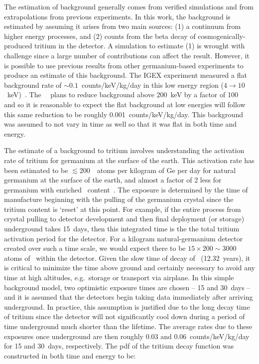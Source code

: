 The estimation of background generally comes from verified simulations and from extrapolations from previous experiments.  In this work, the background is estimated by assuming it arises from two main sources: (1) a continuum from higher energy processes, and (2) counts from the beta decay of cosmogenically-produced tritium in the detector.  A simulation to estimate (1) is wrought with challenge since a large number of contributions can affect the result.  However, it is possible to use previous results from other germanium-based experiments to produce an estimate of this background.  The IGEX experiment measured a flat background rate of $\sim0.1$~counts/keV/kg/day in this low energy region ($4\to10$~keV)~\cite{Ira01}.    The \MJ~\minmod~plans to reduce background above 200~keV by a factor of 100~\cite{Gaitskell:2003zr} and so it is reasonable to expect the flat background at low energies will follow this same reduction to be roughly 0.001~counts/keV/kg/day.  This background was assumed to not vary in time as well so that it was flat in both time and energy.

The estimate of a background to tritium involves understanding the activation rate of tritium for germanium at the surface of the earth.  This activation rate has been estimated to be $\lesssim200$~\hthree~atoms per kilogram of Ge per day for natural germanium at the surface of the earth, and almost a factor of 2 less for germanium with enriched \gersevensix~content~\cite{Avi92}.  The exposure is determined by the time of manufacture beginning with the pulling of the germanium crystal since the tritium content is `reset' at this point.  For example, if the entire process from crystal pulling to detector development and then final deployment (or storage) underground takes 15~days, then this integrated time is the the total tritium activation period for the detector.  For a kilogram natural-germanium detector created over such a time scale, we would expect there to be $15\times200\sim3000$ atoms of \hthree~within the detector.  Given the slow time of decay of \hthree~(12.32~years), it is critical to minimize the time above ground and certainly necessary to avoid any time at high altitudes, e.g.~storage or transport via airplane.  In this simple background model, two optimistic exposure times are chosen -- 15 and 30~days -- and it is assumed that the detectors begin taking data immediately after arriving underground.  In practice, this assumption is justified due to the long decay time of tritium since the detector will not significantly cool down during a period of time underground much shorter than the lifetime.  The average rates due to these exposures once underground are then roughly 0.03 and 0.06~counts/keV/kg/day for 15 and 30~days, respectively.  The pdf of the tritium decay function was constructed in both time and energy to be:

